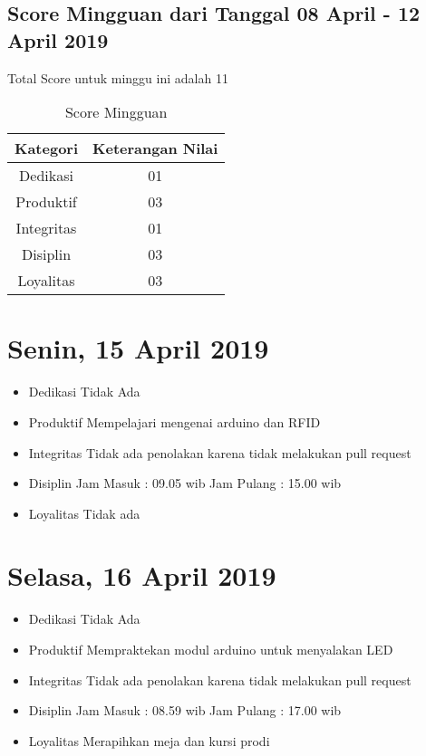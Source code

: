 \subsection{Score Mingguan dari Tanggal 08 April - 12 April 2019}
Total Score untuk minggu ini adalah 11

\begin{table}[h]
\caption{Score Mingguan}
\centering
\begin{tabular}{|c|c|}
\hline
\textbf{Kategori}&\textbf{Keterangan Nilai}\\
\hline
Dedikasi&01\\
\hline
Produktif&03\\
\hline
Integritas&01\\
\hline
Disiplin&03\\
\hline
Loyalitas&03\\
\hline
\end{tabular}
\label{table:score mingguan}
\end{table}

\section{Senin, 15 April 2019}
\begin{itemize}
\item Dedikasi
\subitem Tidak Ada
\item Produktif
  \subitem Mempelajari mengenai arduino dan RFID
\item Integritas
  \subitem Tidak ada penolakan karena tidak melakukan pull request
\item Disiplin
  \subitem Jam Masuk : 09.05 wib
  \subitem Jam Pulang : 15.00 wib
\item Loyalitas
  \subitem Tidak ada
\end{itemize}

\section{Selasa, 16 April 2019}
\begin{itemize}
\item Dedikasi
\subitem Tidak Ada
\item Produktif
  \subitem Mempraktekan modul arduino untuk menyalakan LED
\item Integritas
  \subitem Tidak ada penolakan karena tidak melakukan pull request
\item Disiplin
  \subitem Jam Masuk : 08.59 wib
  \subitem Jam Pulang : 17.00 wib
\item Loyalitas
  \subitem Merapihkan meja dan kursi prodi
\end{itemize}

